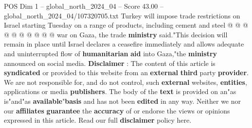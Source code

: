 \begin{textsample}{POS Dim 1 – global\_north\_2024\_04 – Score 43.00 – global\_north\_2024\_04/107320705.txt}
Turkey will impose trade restrictions on Israel starting Tuesday on a range of products, including cement and steel @ @ @ @ @ @ @ @ @ @ war on Gaza, the trade \textbf{ministry} said."This decision will remain in place until Israel declares a ceasefire immediately and allows adequate and uninterrupted flow of \textbf{humanitarian} \textbf{aid} into Gaza,"the \textbf{ministry} announced on social media. \textbf{Disclaimer} : The content of this article is \textbf{syndicated} or provided to this website from an \textbf{external} \textbf{third} party \textbf{provider}.
We are not responsible for, and do not control, such \textbf{external} websites, \textbf{entities}, applications or media \textbf{publishers}.
The body of the \textbf{text} is provided on an"as is"and"as \textbf{available}"\textbf{basis} and has not been \textbf{edited} in any way.
Neither we nor our \textbf{affiliates} \textbf{guarantee} the \textbf{accuracy} of or endorse the views or opinions expressed in this article.
Read our full \textbf{disclaimer} policy here.

\end{textsample}
